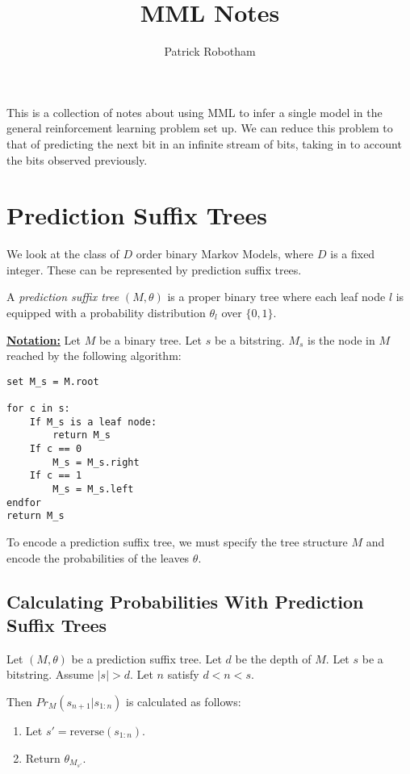 \documentclass[12pt,a4paper,twoside]{article}
\author{Patrick Robotham}
\title{MML Notes}
\theoremstyle{upright}
\begin{document}
\maketitle
This is a collection of notes about using MML to infer a single model in the general 
reinforcement learning problem set up.
We can reduce this problem to that of predicting the next bit in an infinite stream
of bits, taking in to account the bits observed previously.


\section{Prediction Suffix Trees}

We look at the class of $D$ order binary Markov Models, where $D$ is a fixed integer.
These can be represented by prediction suffix trees.

\dfn
A \emph{prediction suffix tree} $(M,\theta)$ is a proper binary tree where each leaf node
$l$ is equipped with a probability distribution $\theta_l$
over $\{0,1\}$.

{\bf\underline {Notation:}}
Let $M$ be a binary tree. Let $s$ be a bitstring.
$M_s$ is the node in $M$ reached by the following algorithm:

\begin{verbatim}
set M_s = M.root

for c in s:
    If M_s is a leaf node:
        return M_s
    If c == 0
        M_s = M_s.right
    If c == 1
        M_s = M_s.left
endfor
return M_s

\end{verbatim}

To encode a prediction suffix tree, we must specify the tree structure $M$ and 
encode the probabilities of the leaves $\theta$.

\subsection{Calculating Probabilities With Prediction Suffix Trees}
Let $(M, \theta)$ be a prediction suffix tree.
Let $d$ be the depth of $M$.
Let $s$ be a bitstring. Assume $|s| > d$. Let $n$ satisfy $d < n < s$.


Then $Pr_M(s_{n+1} | s_{1:n})$ is calculated as follows:

\begin{enumerate}
\item Let $s' = \text{reverse}(s_{1:n})$.
\item Return $\theta_{M_{s'}}$.
\end{enumerate}
\end{document}
